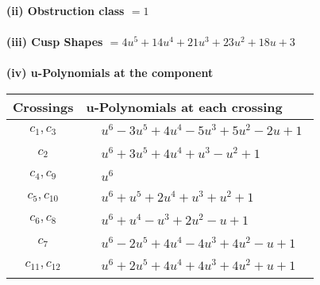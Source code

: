 \documentclass[1p]{elsarticle_modified}
\theoremstyle{definition}
\begin{document}
\flushleft \textbf{(ii) Obstruction class $= 1$}\\~\\
\flushleft \textbf{(iii) Cusp Shapes $= 4 u^5+14 u^4+21 u^3+23 u^2+18 u+3$}\\~\\
\newpage\renewcommand{\arraystretch}{1}
\flushleft \textbf{(iv) u-Polynomials at the component}\newline \\
\begin{tabular}{m{50pt}|m{274pt}}
Crossings & \hspace{64pt}u-Polynomials at each crossing \\
\hline $$\begin{aligned}c_{1},c_{3}\end{aligned}$$&$\begin{aligned}
&u^6-3 u^5+4 u^4-5 u^3+5 u^2-2 u+1
\end{aligned}$\\
\hline $$\begin{aligned}c_{2}\end{aligned}$$&$\begin{aligned}
&u^6+3 u^5+4 u^4+u^3- u^2+1
\end{aligned}$\\
\hline $$\begin{aligned}c_{4},c_{9}\end{aligned}$$&$\begin{aligned}
&u^6
\end{aligned}$\\
\hline $$\begin{aligned}c_{5},c_{10}\end{aligned}$$&$\begin{aligned}
&u^6+u^5+2 u^4+u^3+u^2+1
\end{aligned}$\\
\hline $$\begin{aligned}c_{6},c_{8}\end{aligned}$$&$\begin{aligned}
&u^6+u^4- u^3+2 u^2- u+1
\end{aligned}$\\
\hline $$\begin{aligned}c_{7}\end{aligned}$$&$\begin{aligned}
&u^6-2 u^5+4 u^4-4 u^3+4 u^2- u+1
\end{aligned}$\\
\hline $$\begin{aligned}c_{11},c_{12}\end{aligned}$$&$\begin{aligned}
&u^6+2 u^5+4 u^4+4 u^3+4 u^2+u+1
\end{aligned}$\\
\hline
\end{tabular}\\~\\
\end{document}

